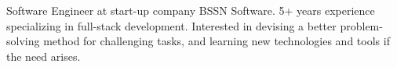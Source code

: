

\begin{cvparagraph}

Software Engineer at start-up company BSSN Software. 5+ years experience specializing in full-stack development. Interested in devising a better problem-solving method for challenging tasks, and learning new technologies and tools if the need arises.
\end{cvparagraph}
